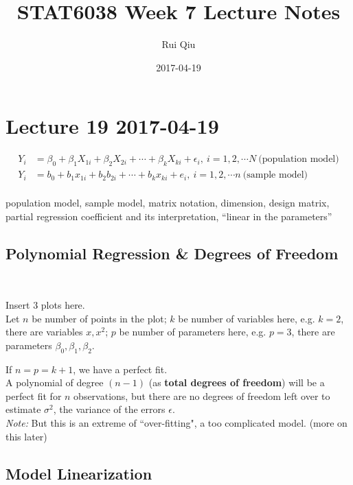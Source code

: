 \documentclass[a4paper, 11pt, twoside]{article}
\begin{document}
\title{STAT6038 Week 7 Lecture Notes}
\author{Rui Qiu}
\date{2017-04-19}

\maketitle

\section{Lecture 19 2017-04-19}

\[
\begin{split}
	Y_i&=\beta_0 + \beta_1X_{1i}+\beta_2X_{2i}+\cdots +\beta_kX_{ki}+\epsilon_i,\ i = 1, 2, \cdots N\ \text{(population model)}\\
	Y_i&=b_0 + b_1x_{1i}+b_2b_{2i}+\cdots +b_kx_{ki}+e_i,\ i = 1, 2, \cdots n\ \text{(sample model)}\\
\end{split}
\]

population model, sample model, matrix notation, dimension, design matrix, partial regression coefficient and its interpretation, ``linear in the parameters''

\subsection{Polynomial Regression \& Degrees of Freedom}\

Insert 3 plots here.\\

Let $n$ be number of points in the plot; $k$ be number of variables here, e.g. $k=2$, there are variables $x, x^2$; $p$ be number of parameters here, e.g. $p=3$, there are parameters $\beta_0,\beta_1,\beta_2$.

If $n=p=k+1$, we have a perfect fit.\\

A polynomial of degree $(n-1)$ (as \textbf{total degrees of freedom}) will be a perfect fit for $n$ observations, but there are no degrees of freedom left over to estimate $\sigma^2$, the variance of the errors $\epsilon$.\\

\textit{Note:} But this is an extreme of ``over-fitting", a too complicated model. (more on this later)

\subsection{Model Linearization}
\end{document}
